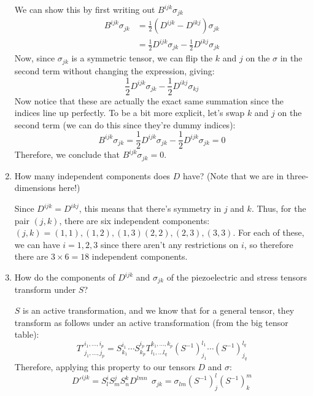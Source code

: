 \documentclass[10pt]{article}
\begin{document}
\begin{enumerate}[label=\alph*)]
	\begin{solution}
		We can show this by first writing out $B^{ijk}\sigma_{jk}$
		\begin{align*}
			B^{ijk}\sigma_{jk} &= \frac{1}{2}\left( D^{ijk} - D^{ikj} \right) \sigma_{jk} \\
							   &= \frac{1}{2}D^{ijk} \sigma_{jk} - \frac{1}{2}D^{ikj}\sigma_{jk}
		\end{align*}
		Now, since $\sigma_{jk}$ is a symmetric tensor, we can flip the $k$ and $j$ on the $\sigma$ in the 
		second term without changing the expression, giving:
		\[
			\frac{1}{2}D^{ijk}\sigma_{jk} - \frac{1}{2}D^{ikj} \sigma_{kj}
		\] 
		Now notice that these are actually the exact same summation since the indices line up perfectly. To 
		be a bit more explicit, let's swap $k$ and $j$ on the second term (we can do this since they're dummy
		indices):
		\[
			B^{ijk} \sigma_{jk} = \frac{1}{2}D^{ijk} \sigma_{jk} - \frac{1}{2}D^{ijk} \sigma_{jk} = 0
		\] 
		Therefore, we conclude that $B^{ijk}\sigma_{jk} = 0$. 
	\end{solution}
\item How many independent components does $D$ have? (Note that we are in three-dimensions here!)

	\begin{solution}
		Since $D^{ijk} = D^{ikj}$, this means that there's symmetry in $j$ and $k$. Thus, for the pair $(j, k)$,
		there are six independent components: $(j, k) = (1, 1), (1, 2), (1, 3) (2, 2), (2, 3), (3, 3)$. For
		each of these, we can have $i = 1, 2, 3$ since there aren't any restrictions on $i$, so therefore 
		there are $3 \times 6 = 18$ independent components.
	\end{solution}
\item How do the components of $D^{ijk}$ and $\sigma_{jk}$ of the piezoelectric and stress tensors transform
	under $S$?

	\begin{solution}
		$S$ is an active transformation, and we know that for a general tensor, they transform as follows
		under an active transformation (from the big tensor table):
		\[
			T'^{i_1, \dots, i_p}_{j_1, \dots, j_p} = S^{i_1}_{k_1} \cdots S^{i_p}_{k_p} T^{k_1, \dots, k_p}_{l_1, \dots l_q} (S^{-1})^{l_1}_{j_1} \cdots (S^{-1})^{l_q}_{j_q}
		\] 
		Therefore, applying this property to our tensors $D$ and $\sigma$:
		\[
			D'^{ijk} = S^i_l S^j_m S^k_n D^{lmn} \ \ \sigma_{jk} = \sigma_{lm} (S^{-1})^l_j (S^{-1})^m_k
		\] 
	\end{solution}
\end{enumerate}
\end{document}
